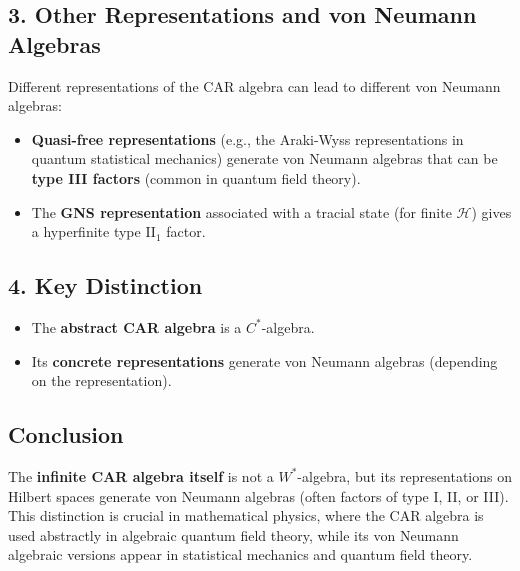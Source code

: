 \documentclass{article}
\begin{document}
\subsection*{3. Other Representations and von Neumann Algebras}
Different representations of the CAR algebra can lead to different von Neumann algebras:
\begin{itemize}
    \item \textbf{Quasi-free representations} (e.g., the Araki-Wyss representations in quantum statistical mechanics) generate von Neumann algebras that can be \textbf{type III factors} (common in quantum field theory).
    \item The \textbf{GNS representation} associated with a tracial state (for finite \(\mathcal{H}\)) gives a hyperfinite type II\(_1\) factor.
\end{itemize}

\subsection*{4. Key Distinction}
\begin{itemize}
    \item The \textbf{abstract CAR algebra} is a \( C^* \)-algebra.
    \item Its \textbf{concrete representations} generate von Neumann algebras (depending on the representation).
\end{itemize}

\subsection*{Conclusion}
The \textbf{infinite CAR algebra itself} is not a \( W^* \)-algebra, but its representations on Hilbert spaces generate von Neumann algebras (often factors of type I, II, or III). This distinction is crucial in mathematical physics, where the CAR algebra is used abstractly in algebraic quantum field theory, while its von Neumann algebraic versions appear in statistical mechanics and quantum field theory.
\end{document}

